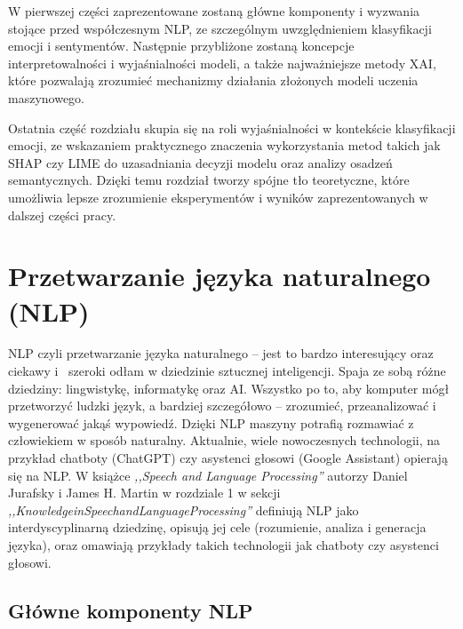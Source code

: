 \documentclass[wmii, inf, mgr]{uwmthesis}
\begin{document}
W pierwszej części zaprezentowane zostaną główne komponenty i wyzwania stojące przed współczesnym NLP, ze szczególnym uwzględnieniem klasyfikacji emocji i sentymentów. Następnie przybliżone zostaną koncepcje interpretowalności i wyjaśnialności modeli, a także najważniejsze metody XAI, które pozwalają zrozumieć mechanizmy działania złożonych modeli uczenia maszynowego.  

Ostatnia część rozdziału skupia się na roli wyjaśnialności w kontekście klasyfikacji emocji, ze wskazaniem praktycznego znaczenia wykorzystania metod takich jak SHAP czy LIME do uzasadniania decyzji modelu oraz analizy osadzeń semantycznych. Dzięki temu rozdział tworzy spójne tło teoretyczne, które umożliwia lepsze zrozumienie eksperymentów i wyników zaprezentowanych w dalszej części pracy.

\section{Przetwarzanie języka naturalnego (NLP)}
NLP czyli przetwarzanie języka naturalnego -- jest to bardzo interesujący oraz ciekawy i~ szeroki odłam w dziedzinie sztucznej inteligencji. Spaja ze sobą różne dziedziny: lingwistykę, informatykę oraz AI. Wszystko po to, aby komputer mógł przetworzyć ludzki język, a bardziej szczegółowo -- zrozumieć, przeanalizować i wygenerować jakąś wypowiedź. Dzięki NLP maszyny potrafią rozmawiać z człowiekiem w sposób naturalny. Aktualnie, wiele nowoczesnych technologii, na przykład chatboty (ChatGPT) czy asystenci głosowi (Google Assistant) opierają się na NLP. W książce \textit{,,Speech and Language Processing''} \cite{SpeechandLanguageProcessing} autorzy Daniel Jurafsky i James H. Martin w rozdziale 1 w sekcji \textit{,,KnowledgeinSpeechandLanguageProcessing''} definiują NLP jako interdyscyplinarną dziedzinę, opisują jej cele (rozumienie, analiza i generacja języka), oraz omawiają przykłady takich technologii jak chatboty czy asystenci głosowi.

\subsection{Główne komponenty NLP}
\end{document}
